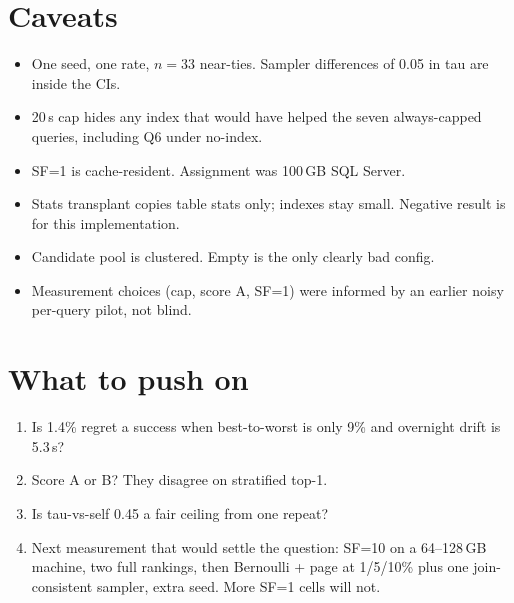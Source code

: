 \documentclass[11pt,a4paper]{article}
\begin{document}
\section{Caveats}

\begin{itemize}
\item One seed, one rate, $n=33$ near-ties. Sampler differences of 0.05 in tau are inside the CIs.
\item 20\,s cap hides any index that would have helped the seven always-capped queries, including Q6 under no-index.
\item SF=1 is cache-resident. Assignment was 100\,GB SQL Server.
\item Stats transplant copies table stats only; indexes stay small. Negative result is for this implementation.
\item Candidate pool is clustered. Empty is the only clearly bad config.
\item Measurement choices (cap, score A, SF=1) were informed by an earlier noisy per-query pilot, not blind.
\end{itemize}

\section{What to push on}

\begin{enumerate}
\item Is 1.4\% regret a success when best-to-worst is only 9\% and overnight drift is 5.3\,s?
\item Score A or B? They disagree on stratified top-1.
\item Is tau-vs-self 0.45 a fair ceiling from one repeat?
\item Next measurement that would settle the question: SF=10 on a 64--128\,GB machine, two full rankings, then Bernoulli + page at 1/5/10\% plus one join-consistent sampler, extra seed. More SF=1 cells will not.
\end{enumerate}
\end{document}
